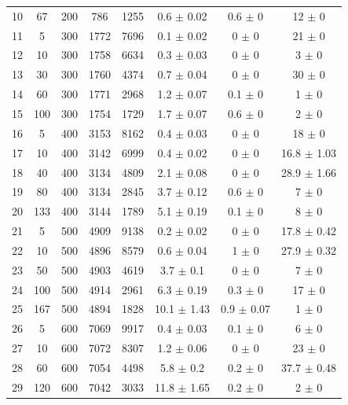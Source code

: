 \documentclass[11pt]{article}
\begin{document}
\begin{table}[]
{\begin{tabular}{cccccccc}
				10 & 67 & 200 & 786 & 1255 & 0.6 $\pm$ 0.02 & 0.6 $\pm$ 0 & 12 $\pm$ 0 \\
				\rowcolor[HTML]{EFEFEF} 
				11 & 5 & 300 & 1772 & 7696 & 0.1 $\pm$ 0.02 & 0 $\pm$ 0 & 21 $\pm$ 0 \\
				\rowcolor[HTML]{EFEFEF} 
				12 & 10 & 300 & 1758 & 6634 & 0.3 $\pm$ 0.03 & 0 $\pm$ 0 & 3 $\pm$ 0 \\
				\rowcolor[HTML]{EFEFEF} 
				13 & 30 & 300 & 1760 & 4374 & 0.7 $\pm$ 0.04 & 0 $\pm$ 0 & 30 $\pm$ 0 \\
				\rowcolor[HTML]{EFEFEF} 
				14 & 60 & 300 & 1771 & 2968 & 1.2 $\pm$ 0.07 & 0.1 $\pm$ 0 & 1 $\pm$ 0 \\
				\rowcolor[HTML]{EFEFEF} 
				15 & 100 & 300 & 1754 & 1729 & 1.7 $\pm$ 0.07 & 0.6 $\pm$ 0 & 2 $\pm$ 0 \\
				16 & 5 & 400 & 3153 & 8162 & 0.4 $\pm$ 0.03 & 0 $\pm$ 0 & 18 $\pm$ 0 \\
				17 & 10 & 400 & 3142 & 6999 & 0.4 $\pm$ 0.02 & 0 $\pm$ 0 & 16.8 $\pm$ 1.03 \\
				18 & 40 & 400 & 3134 & 4809 & 2.1 $\pm$ 0.08 & 0 $\pm$ 0 & 28.9 $\pm$ 1.66 \\
				19 & 80 & 400 & 3134 & 2845 & 3.7 $\pm$ 0.12 & 0.6 $\pm$ 0 & 7 $\pm$ 0 \\
				20 & 133 & 400 & 3144 & 1789 & 5.1 $\pm$ 0.19 & 0.1 $\pm$ 0 & 8 $\pm$ 0 \\
				\rowcolor[HTML]{EFEFEF} 
				21 & 5 & 500 & 4909 & 9138 & 0.2 $\pm$ 0.02 & 0 $\pm$ 0 & 17.8 $\pm$ 0.42 \\
				\rowcolor[HTML]{EFEFEF} 
				22 & 10 & 500 & 4896 & 8579 & 0.6 $\pm$ 0.04 & 1 $\pm$ 0 & 27.9 $\pm$ 0.32 \\
				\rowcolor[HTML]{EFEFEF} 
				23 & 50 & 500 & 4903 & 4619 & 3.7 $\pm$ 0.1 & 0 $\pm$ 0 & 7 $\pm$ 0 \\
				\rowcolor[HTML]{EFEFEF} 
				24 & 100 & 500 & 4914 & 2961 & 6.3 $\pm$ 0.19 & 0.3 $\pm$ 0 & 17 $\pm$ 0 \\
				\rowcolor[HTML]{EFEFEF} 
				25 & 167 & 500 & 4894 & 1828 & 10.1 $\pm$ 1.43 & 0.9 $\pm$ 0.07 & 1 $\pm$ 0 \\
				26 & 5 & 600 & 7069 & 9917 & 0.4 $\pm$ 0.03 & 0.1 $\pm$ 0 & 6 $\pm$ 0 \\
				27 & 10 & 600 & 7072 & 8307 & 1.2 $\pm$ 0.06 & 0 $\pm$ 0 & 23 $\pm$ 0 \\
				28 & 60 & 600 & 7054 & 4498 & 5.8 $\pm$ 0.2 & 0.2 $\pm$ 0 & 37.7 $\pm$ 0.48 \\
				29 & 120 & 600 & 7042 & 3033 & 11.8 $\pm$ 1.65 & 0.2 $\pm$ 0 & 2 $\pm$ 0 \\

\end{tabular}}
\end{table}
\end{document}

